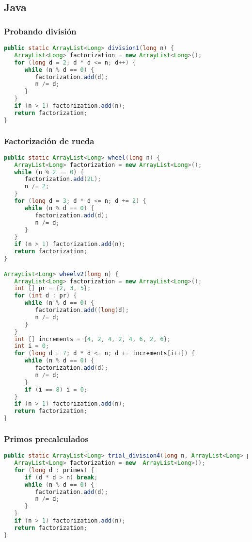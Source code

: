\subsection{Java}

\subsubsection{Probando división}
\begin{lstlisting}[language=Java]
public static ArrayList<Long> division1(long n) {
   ArrayList<Long> factorization = new ArrayList<Long>();
   for (long d = 2; d * d <= n; d++) {
      while (n % d == 0) {
         factorization.add(d);
         n /= d;
      }
   }
   if (n > 1) factorization.add(n);
   return factorization;
}
\end{lstlisting}

\subsubsection{Factorización de rueda}
\begin{lstlisting}[language=Java]
public static ArrayList<Long> wheel(long n) {
   ArrayList<Long> factorization = new ArrayList<Long>();
   while (n % 2 == 0) {
      factorization.add(2L);
      n /= 2;
   }
   for (long d = 3; d * d <= n; d += 2) {
      while (n % d == 0) {
         factorization.add(d);
         n /= d;
      }
   }
   if (n > 1) factorization.add(n);
   return factorization;
}

ArrayList<Long> wheelv2(long n) {
   ArrayList<Long> factorization = new ArrayList<Long>();
   int [] pr = {2, 3, 5};
   for (int d : pr) {
      while (n % d == 0) {
         factorization.add((long)d);
         n /= d;
      }
   }
   int [] increments = {4, 2, 4, 2, 4, 6, 2, 6};
   int i = 0;
   for (long d = 7; d * d <= n; d += increments[i++]) {
      while (n % d == 0) {
         factorization.add(d);
         n /= d;
      }
      if (i == 8) i = 0;
   }
   if (n > 1) factorization.add(n);
   return factorization;
}
\end{lstlisting} 

\subsubsection{Primos precalculados}
\begin{lstlisting}[language=Java]
public static ArrayList<Long> trial_division4(long n, ArrayList<Long> primes) {
   ArrayList<Long> factorization = new  ArrayList<Long>();
   for (long d : primes) {
      if (d * d > n) break;
      while (n % d == 0) {
         factorization.add(d);
         n /= d;
      }
   }
   if (n > 1) factorization.add(n);
   return factorization;
}
\end{lstlisting} 


